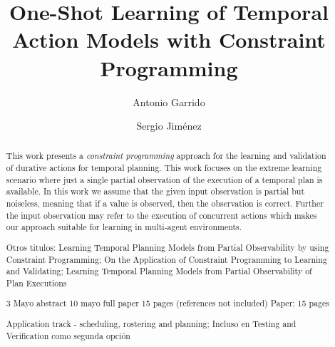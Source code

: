 \documentclass[runningheads]{llncs}
\begin{document}
\title{One-Shot Learning of Temporal Action Models with Constraint Programming}


%
\author{Antonio Garrido \and Sergio Jim\'enez}

%

\maketitle              %

\begin{abstract}
  This work presents a {\em constraint programming} approach for the learning and validation of durative actions for temporal planning. This work focuses on the extreme learning scenario where just a single partial observation of the execution of a temporal plan is available. In this work we assume that the given input observation is partial but noiseless, meaning that if a value is observed, then the observation is correct. Further the input observation may refer to the execution of concurrent actions which makes our approach suitable for learning in multi-agent environments.  
  
Otros titulos:  Learning Temporal Planning Models from Partial Observability by using Constraint Programming; On the Application of Constraint Programming to Learning and Validating;
Learning Temporal Planning Models from Partial Observability of Plan Executions

3 Mayo abstract
10 mayo full paper 15 pages (references not included)
Paper: 15 pages

Application track - scheduling, rostering and planning;
Incluso en Testing and Verification como segunda opción

\end{abstract}
\end{document}
